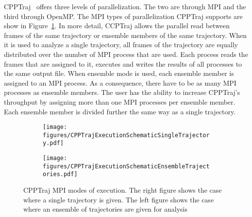 \label{background}

CPPTraj~\cite{cpptraj-2013} offers three levels of parallelization. The two are through MPI and the third through OpenMP.
The MPI types of parallelization CPPTraj supports are show in Figure~\ref{fig:cpptraj_arch}. In more detail,
CCPTraj allows the parallel read between frames of the same trajectory or ensemble members of
the same trajectory. When it is used to analyze a single trajectory, all frames of the trajectory
are equally distributed over the number of MPI process that are used. Each process reads the frames
that are assigned to it, executes and writes the results of all processes to the same output file.
When ensemble mode is used, each ensemble member is assigned to an MPI process. As a consequence,
there have to be as many MPI processes as ensemble members. The user has the ability to increase 
CPPTraj's throughput by assigning more than one MPI processes per ensemble member. Each ensemble 
member is divided further the same way as a single trajectory.
\begin{figure}[ht!]
		\begin{subfigure}{.5\textwidth}
		\centering
		\texttt{[image: figures/CPPTrajExecutionSchematicSingleTrajectory.pdf]}
	\end{subfigure}
	\begin{subfigure}{.5\textwidth}
		\centering
		\texttt{[image: figures/CPPTrajExecutionSchematicEnsembleTrajectories.pdf]}
	\end{subfigure}
	\caption{CPPTraj MPI modes of execution. The right figure shows the case where a single trajectory is
		given. The left figure shows the case where an ensemble of trajectories are given for analysis}
	\label{fig:cpptraj_arch}
\end{figure}

